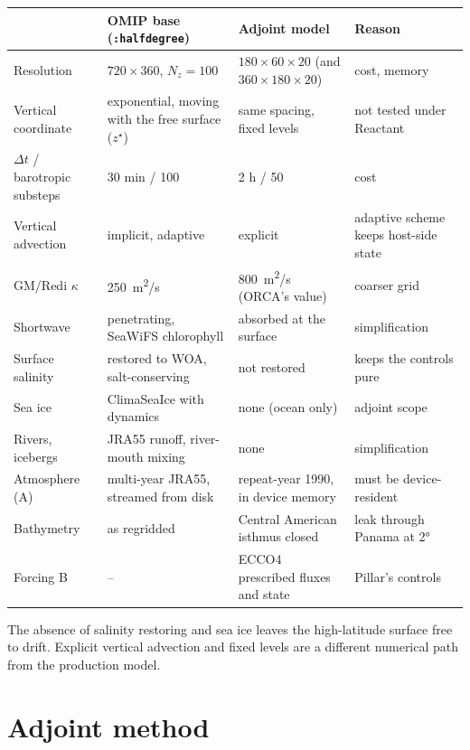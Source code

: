 \documentclass[10pt]{article}
\begin{document}
\begin{center}\small
\begin{tabular}{@{}p{}p{}p{}p{}@{}}
\toprule
& OMIP base (\texttt{:halfdegree}) & Adjoint model & Reason \\
\midrule
Resolution & $720\times360$, $N_z = 100$ & $180\times60\times20$ (and $360\times180\times20$) & cost, memory \\
Vertical coordinate & exponential, moving with the free surface ($z^\star$) & same spacing, fixed levels & not tested under Reactant \\
$\Delta t$ / barotropic substeps & 30 min / 100 & 2 h / 50 & cost \\
Vertical advection & implicit, adaptive & explicit & adaptive scheme keeps host-side state \\
GM/Redi $\kappa$ & \SI{250}{m^2/s} & \SI{800}{m^2/s} (ORCA's value) & coarser grid \\
Shortwave & penetrating, SeaWiFS chlorophyll & absorbed at the surface & simplification \\
Surface salinity & restored to WOA, salt-conserving & not restored & keeps the controls pure \\
Sea ice & ClimaSeaIce with dynamics & none (ocean only) & adjoint scope \\
Rivers, icebergs & JRA55 runoff, river-mouth mixing & none & simplification \\
Atmosphere (A) & multi-year JRA55, streamed from disk & repeat-year 1990, in device memory & must be device-resident \\
Bathymetry & as regridded & Central American isthmus closed & leak through Panama at \ang{2} \\
Forcing B & -- & ECCO4 prescribed fluxes and state & Pillar's controls \\
\bottomrule
\end{tabular}
\end{center}
The absence of salinity restoring and sea ice leaves the high-latitude surface free to drift. Explicit vertical
advection and fixed levels are a different numerical path from the production model.

\section{Adjoint method}
\end{document}
